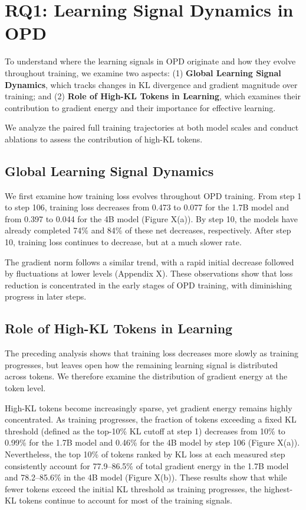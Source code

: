 \section{RQ1: Learning Signal Dynamics in OPD}
\label{sec:RQ1}

To understand where the learning signals in OPD originate and how they evolve throughout training, we examine two aspects: (1) \textbf{Global Learning Signal Dynamics}, which tracks changes in KL divergence and gradient magnitude over training; and (2) \textbf{Role of High-KL Tokens in Learning}, which examines their contribution to gradient energy and their importance for effective learning.

We analyze the paired full training trajectories at both model scales and conduct ablations to assess the contribution of high-KL tokens.

\subsection{Global Learning Signal Dynamics}

We first examine how training loss evolves throughout OPD training. From step 1 to step 106, training loss decreases from 0.473 to 0.077 for the 1.7B model and from 0.397 to 0.044 for the 4B model (Figure X(a)). By step 10, the models have already completed 74\% and 84\% of these net decreases, respectively. After step 10, training loss continues to decrease, but at a much slower rate.

The gradient norm follows a similar trend, with a rapid initial decrease followed by fluctuations at lower levels (Appendix X). These observations show that loss reduction is concentrated in the early stages of OPD training, with diminishing progress in later steps.

\subsection{Role of High-KL Tokens in Learning}

The preceding analysis shows that training loss decreases more slowly as training progresses, but leaves open how the remaining learning signal is distributed across tokens. We therefore examine the distribution of gradient energy at the token level.

High-KL tokens become increasingly sparse, yet gradient energy remains highly concentrated. As training progresses, the fraction of tokens exceeding a fixed KL threshold (defined as the top-10\% KL cutoff at step 1) decreases from 10\% to 0.99\% for the 1.7B model and 0.46\% for the 4B model by step 106 (Figure X(a)). Nevertheless, the top 10\% of tokens ranked by KL loss at each measured step consistently account for 77.9--86.5\% of total gradient energy in the 1.7B model and 78.2--85.6\% in the 4B model (Figure X(b)). These results show that while fewer tokens exceed the initial KL threshold as training progresses, the highest-KL tokens continue to account for most of the training signals.

